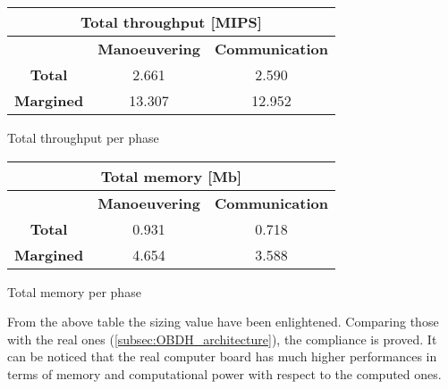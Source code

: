 \vspace*{5mm}
\begin{minipage}{0.5\linewidth}
    \centering
    \cfs{\widthtab}
    \captionsetup{type=table}
    \renewcommand{\arraystretch}{1.4}
    \begin{tabular}{|c|c|c|}
        \hline
        \multicolumn{3}{|c|}{\cellcolor{bluePoli!25}\textbf{Total throughput [MIPS]}} \\
        \hline
        \hline
        & \textbf{Manoeuvering} & \textbf{Communication} \\
        \hline
        \textbf{Total} & 2.661 & 2.590 \\
        \hline
        \textbf{Margined} & \cellcolor{yellow!50}13.307 & 12.952 \\
        \hline
    \end{tabular}
    \caption{Total throughput per phase}
    \label{table:tot_throughput}
\end{minipage}\hfill
\begin{minipage}{0.5\linewidth}
    \centering
    \cfs{\widthtab}
    \captionsetup{type=table}
    \renewcommand{\arraystretch}{1.4}
    \begin{tabular}{|c|c|c|}
        \hline
        \multicolumn{3}{|c|}{\cellcolor{bluePoli!25}\textbf{Total memory [Mb]}} \\
        \hline
        \hline
        & \textbf{Manoeuvering} & \textbf{Communication} \\
        \hline
        \textbf{Total} & 0.931 & 0.718 \\
        \hline
        \textbf{Margined} & \cellcolor{yellow!50}4.654 & 3.588 \\
        \hline
    \end{tabular}
    \caption{Total memory per phase}
    \label{table:tot_memory}
\end{minipage}
\vspace*{5mm}

From the above table the sizing value have been enlightened.
Comparing those with the real ones (\autoref{subsec:OBDH_architecture}), the compliance is proved.
It can be noticed that the real computer board has much higher performances in terms of memory and computational power with respect to the computed ones.